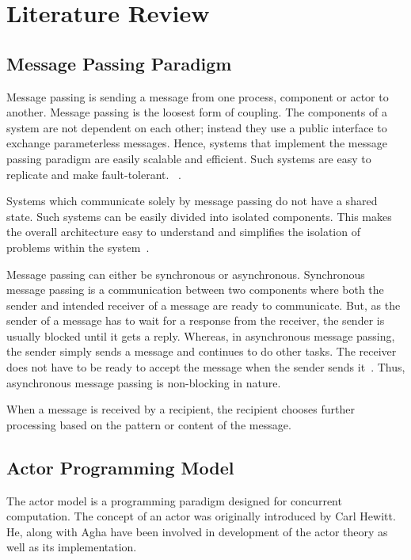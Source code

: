 \chapter{Literature Review}\label{chapter:literature_review}
\section{Message Passing Paradigm}
\label{sec:messagePassing}
  Message passing is sending a message from one process, component or actor to another. Message passing is the loosest form of coupling. The components of a system are not dependent on each other; instead they use a public interface to exchange parameterless messages\cite{joecelko}. Hence, systems that implement the message passing paradigm are easily scalable and efficient. Such systems are easy to replicate and make fault-tolerant.
~\cite{Armstrong:2010:ERL:1810891.1810910}.

  Systems which communicate solely by message passing do not have a shared state. Such systems can be easily divided into isolated components. This makes the overall architecture easy to understand and simplifies the isolation of problems within the system~\cite{Armstrong:2010:ERL:1810891.1810910}.

  Message passing can either be synchronous or asynchronous. Synchronous message passing is a communication between two components where both the sender and intended receiver of a message are ready to communicate. But, as the sender of a message has to wait for a response from the receiver, the sender is usually blocked until it gets a reply. Whereas, in asynchronous message passing, the sender simply sends a message and continues to do other tasks. The receiver does not have to be ready to accept the message when the sender sends it~\cite{agha}. Thus, asynchronous message passing is non-blocking in nature.

  When a message is received by a recipient, the recipient chooses further processing based on the pattern or content of the message.

\section{Actor Programming Model}
\label{sec:actorProgramming}
  The actor model is a programming paradigm designed for concurrent computation. The concept of an actor was originally introduced by Carl Hewitt\cite{hewitt}. He, along with Agha\cite{agha} have been involved in development of the actor theory as well as its implementation.

